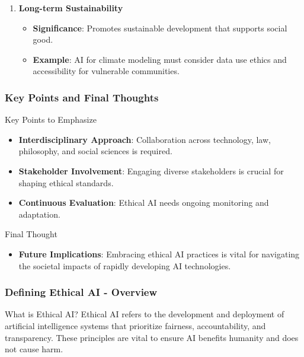 \documentclass{beamer}
\begin{document}
\begin{frame}[fragile]
\begin{enumerate}
        \item \textbf{Long-term Sustainability}
            \begin{itemize}
                \item \textbf{Significance}: Promotes sustainable development that supports social good.
                \item \textbf{Example}: AI for climate modeling must consider data use ethics and accessibility for vulnerable communities.
            \end{itemize}
    \end{enumerate}
\end{frame}

\begin{frame}[fragile]
    \frametitle{Key Points and Final Thoughts}
    
    \begin{block}{Key Points to Emphasize}
        \begin{itemize}
            \item \textbf{Interdisciplinary Approach}: Collaboration across technology, law, philosophy, and social sciences is required.
            \item \textbf{Stakeholder Involvement}: Engaging diverse stakeholders is crucial for shaping ethical standards.
            \item \textbf{Continuous Evaluation}: Ethical AI needs ongoing monitoring and adaptation.
        \end{itemize}
    \end{block}

    \begin{block}{Final Thought}
        \begin{itemize}
            \item \textbf{Future Implications}: Embracing ethical AI practices is vital for navigating the societal impacts of rapidly developing AI technologies.
        \end{itemize}
    \end{block}
\end{frame}

\begin{frame}[fragile]
    \frametitle{Defining Ethical AI - Overview}
    \begin{block}{What is Ethical AI?}
        Ethical AI refers to the development and deployment of artificial intelligence systems that prioritize fairness, accountability, and transparency. These principles are vital to ensure AI benefits humanity and does not cause harm.
    \end{block}
\end{frame}
\end{document}

